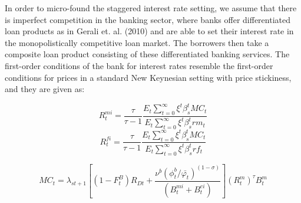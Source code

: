 \documentclass[12pt]{article}
\numberwithin{equation}{section}
\begin{document}
In order to micro-found the staggered interest rate setting, we assume that there is imperfect competition in the banking sector, where banks offer differentiated loan products as in Gerali et. al. (2010) and are able to set their interest rate in the monopolistically competitive loan market. The borrowers then take a composite loan product consisting of these differentiated banking services. The first-order conditions of the bank for interest rates resemble the first-order conditions for prices in a standard New Keynesian setting with price stickiness, and they are given as: 



\begin{equation}
R^{mi}_t=\frac{\tau}{\tau-1}\frac{E_t\sum _{t=0}^{\infty }\xi^t\beta_{s}^t MC_t}{E_t\sum _{t=0}^{\infty }\xi^t\beta_{s}^t rm_t}
\end{equation}
\begin{equation}
R^{fi}_t=\frac{\tau}{\tau-1}\frac{E_t\sum _{t=0}^{\infty }\xi^t\beta_{s}^t MC_t}{E_t\sum _{t=0}^{\infty }\xi^t\beta_{s}^t rf_t}
\end{equation}

\begin{equation}
MC_t=\lambda_{st+1}[(1-F^B_t)R_{Dt}+\frac{\nu^b(\phi^b_t/{\bar{\varphi_t}})^{(1-\sigma)}}{(B^{mi}_t+B^{ei}_t)}](R^m_t)^\tau B^m_t
\end{equation}
\end{document}
